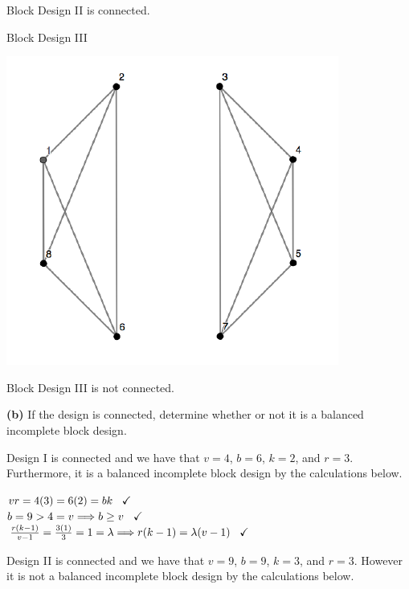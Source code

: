 \documentclass[12pt,]{article}
\begin{document}
Block Design II is connected.

\begin{center}
Block Design III
\end{center}

\begin{center}\includegraphics{Markdown_HW_8_files/figure-latex/unnamed-chunk-9-1} \end{center}

Block Design III is not connected.

\textbf{(b)} If the design is connected, determine whether or not it is
a balanced incomplete block design.

Design I is connected and we have that \(v=4\), \(b=6\), \(k=2\), and
\(r=3\). Furthermore, it is a balanced incomplete block design by the
calculations below.

\begin{center}
$vr = 4(3) = 6(2) = bk \hspace{.3cm}  \checkmark$\\
$b= 9 > 4 =v \Longrightarrow b \geq v \hspace{.3cm}  \checkmark$\\
$\frac{r(k-1)}{v-1} = \frac{3(1)}{3} = 1 = \lambda \Longrightarrow r(k-1) = \lambda (v-1)  \hspace{.3cm} \checkmark$
\end{center}

Design II is connected and we have that \(v=9\), \(b=9\), \(k=3\), and
\(r=3\). However it is not a balanced incomplete block design by the
calculations below.
\end{document}
